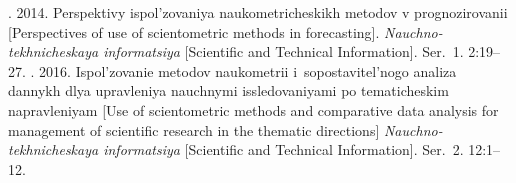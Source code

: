 \begin{multicols}{2}
{{\begin{thebibliography}{99}
    . 2014. Perspektivy 
ispol'zovaniya naukometricheskikh  metodov v prognozirovanii [Perspectives of use 
of scientometric methods in forecasting]. \textit{Nauchno-tekhnicheskaya 
informatsiya} [Scientific and Technical Information]. Ser.~1. 2:19--27. 
    . 2016. Ispol'zovanie 
metodov naukometrii i~sopostavitel'nogo analiza dannykh dlya upravleniya 
nauchnymi issledovaniyami po tematicheskim napravleniyam [Use of scientometric 
methods and comparative data analysis for management of scientific research in the 
thematic directions] \textit{Nauchno-tekhnicheskaya informatsiya} 
[Scientific and Technical Information]. Ser.~2. 12:1--12. 
    
   
   

\end{thebibliography}}}
\end{multicols}
